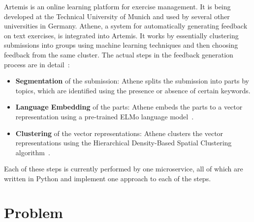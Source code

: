 Artemis is an online learning platform for exercise management. It is being developed at the Technical University of Munich and used by several other universities in Germany. 
Athene, a system for automatically generating feedback on text exercises, is integrated into Artemis. It works by essentially clustering submissions into groups using machine learning techniques and then choosing feedback from the same cluster. The actual steps in the feedback generation process are in detail~\cite{mlFeedbackOnTextualStudentAnswersInLargeCourses}:
\begin{itemize}
    \item \textbf{Segmentation} of the submission: Athene splits the submission into parts by topics, which are identified using the presence or absence of certain keywords.
    \item \textbf{Language Embedding} of the parts: Athene embeds the parts to a vector representation using a pre-trained ELMo language model~\cite{deepContextualizedWordRepresentations}.
    \item \textbf{Clustering} of the vector representations: Athene clusters the vector representations using the Hierarchical Density-Based Spatial Clustering algorithm~\cite{hdbsc}.
\end{itemize}


Each of these steps is currently performed by one microservice, all of which are written in Python and implement one approach to each of the steps.

\section*{Problem}


